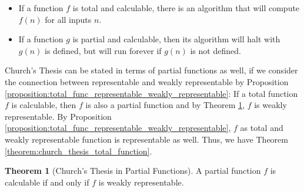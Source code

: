 \documentclass[11pt,letterpaper]{book}
\theoremstyle{definition}
\newtheorem{theorem}{Theorem}[section]
\begin{document}
\begin{itemize}
\item{If a function $f$ is total and calculable, there is an
algorithm that will compute $f(n)$ for all inputs $n$.}
\item{If a function $g$ is partial and calculable, then its
algorithm will halt with $g(n)$ is defined, but will run forever if
$g(n)$ is not defined.}
\end{itemize}




Church's Thesis can be stated in terms of partial functions as well, if
we consider the connection between representable and weakly
representable by Proposition
\ref{proposition:total_func_representable_weakly_representable}: If a total function $f$ is calculable, then $f$ is also a partial function and by Theorem \ref{theorem:church_thesis_partial_function}, $f$ is weakly representable. By Proposition
\ref{proposition:total_func_representable_weakly_representable}, $f$ as total and weakly representable function is representable as well. Thus, we have Theorem \ref{theorem:church_thesis_total_function}.



\begin{theorem}[Church's Thesis in Partial Functions]
\label{theorem:church_thesis_partial_function}
A partial function $f$ is calculable if and only if $f$ is weakly
representable.
\end{theorem}


\end{document}
